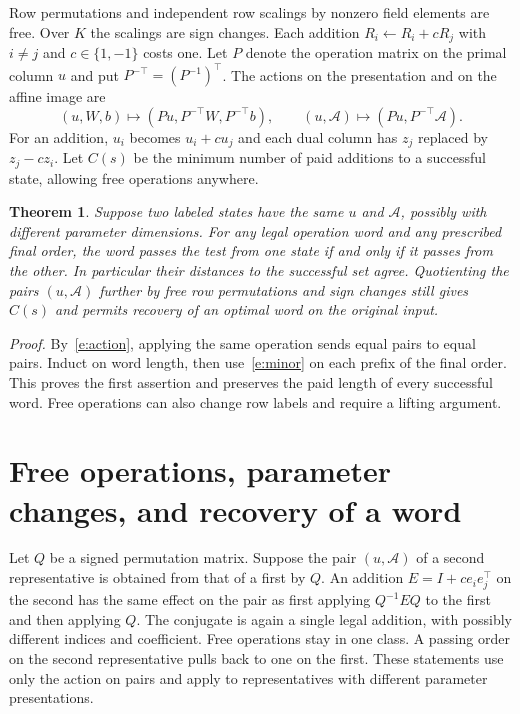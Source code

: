 \documentclass[UTF8,a4paper,11pt,scheme=plain]{ctexart}
\theoremstyle{zh}
\theoremstyle{plain}
\newtheorem{enthm}{Theorem}
\newcommand{\A}{\mathcal A}
\newcommand{\actioneq}{(u,W,b)\longmapsto(Pu,P^{-\top}W,P^{-\top}b),\qquad
       (u,\A)\longmapsto(Pu,P^{-\top}\A).}
\begin{document}
Row permutations and independent row scalings by nonzero field elements are free. Over $K$
the scalings are sign changes. Each addition $R_i\gets R_i+cR_j$ with $i\ne j$ and
$c\in\{1,-1\}$ costs one. Let $P$ denote the operation matrix on the primal column $u$ and
put $P^{-\top}=(P^{-1})^\top$. The actions on the presentation and on the affine image are
\begin{equation}\label{e:action}\actioneq\end{equation}
For an addition, $u_i$ becomes $u_i+cu_j$ and each dual column has $z_j$ replaced by
$z_j-cz_i$. Let $C(s)$ be the minimum number of paid additions to a successful state, allowing
free operations anywhere.

\begin{enthm}\label{e:main}
Suppose two labeled states have the same $u$ and $\A$, possibly with different parameter
dimensions. For any legal operation word and any
prescribed final order, the word passes the test from one state if and only if it passes from
the other. In particular their distances to the successful set agree. Quotienting the pairs
$(u,\A)$ further by free row permutations and sign changes still gives $C(s)$ and permits
recovery of an optimal word on the original input.
\end{enthm}
\noindent\emph{Proof.}\enspace
By~\eqref{e:action}, applying the same operation sends equal pairs to equal pairs. Induct on
word length, then use~\eqref{e:minor} on each prefix of the final order. This proves the
first assertion and preserves the paid length of every successful word. Free operations can
also change row labels and require a lifting argument.

\newpage
\section{Free operations, parameter changes, and recovery of a word}
Let $Q$ be a signed permutation matrix. Suppose the pair $(u,\A)$ of a second representative
is obtained from that of a first by $Q$. An addition $E=I+ce_i e_j^\top$ on the second has
the same effect on the pair as first applying $Q^{-1}EQ$ to the first and then applying $Q$.
The conjugate is again a single legal addition, with possibly different indices and coefficient.
Free operations stay in one class. A passing order on the second representative pulls back to
one on the first. These statements use only the action on pairs and apply to representatives
with different parameter presentations.
\end{document}
